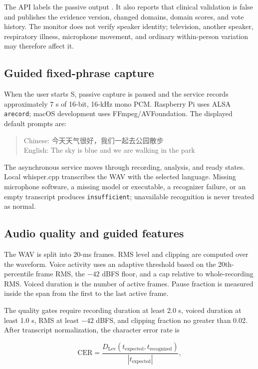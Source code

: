 \documentclass[11pt,a4paper]{article}
\begin{document}
The API labels the passive output . It also reports that clinical validation is false and publishes the evidence version, changed domains, domain scores, and vote history. The monitor does not verify speaker identity; television, another speaker, respiratory illness, microphone movement, and ordinary within-person variation may therefore affect it.

\subsection{Guided fixed-phrase capture}

When the user starts S, passive capture is paused and the service records approximately 7 s of 16-bit, 16-kHz mono PCM. Raspberry Pi uses ALSA \texttt{arecord}; macOS development uses FFmpeg/AVFoundation. The displayed default prompts are:

\begin{quote}
Chinese: {\zhfont 今天天气很好，我们一起去公园散步}\\
English: The sky is blue and we are walking in the park
\end{quote}

The asynchronous service moves through recording, analysis, and ready states. Local whisper.cpp transcribes the WAV with the selected language. Missing microphone software, a missing model or executable, a recognizer failure, or an empty transcript produces \texttt{insufficient}; unavailable recognition is never treated as normal.

\subsection{Audio quality and guided features}

The WAV is split into 20-ms frames. RMS level and clipping are computed over the waveform. Voice activity uses an adaptive threshold based on the 20th-percentile frame RMS, the $-42$ dBFS floor, and a cap relative to whole-recording RMS. Voiced duration is the number of active frames. Pause fraction is measured inside the span from the first to the last active frame.

The quality gates require recording duration at least 2.0 s, voiced duration at least 1.0 s, RMS at least $-42$ dBFS, and clipping fraction no greater than 0.02. After transcript normalization, the character error rate is

\begin{equation}
\mathrm{CER}=\frac{D_{\mathrm{Lev}}(t_{\mathrm{expected}},t_{\mathrm{recognized}})}
{|t_{\mathrm{expected}}|},
\end{equation}
\end{document}
